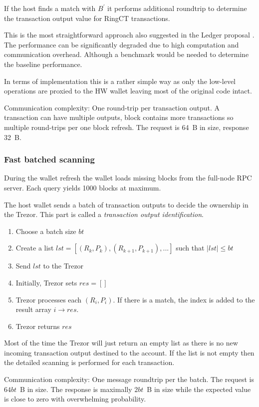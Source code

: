 \documentclass[]{article}
\begin{document}
If the host finds a match with $B^\prime$ it performs additional roundtrip to determine the transaction output value for RingCT transactions.

This is the most straightforward approach also suggested in the Ledger proposal \cite{ledger_doc}. The performance can be significantly degraded due to high computation and communication overhead. Although a benchmark would be needed to determine the baseline performance.

In terms of implementation this is a rather simple way as only the low-level operations are proxied to the HW wallet leaving most of the original code intact.

Communication complexity: One round-trip per transaction output. A transaction can have multiple outputs, block contains more transactions so multiple round-trips per one block refresh. The request is 64~B in size, response 32~B.

\subsubsection{Fast batched scanning}
During the wallet refresh the wallet loads missing blocks from the full-node RPC server. Each query yields 1000 blocks at maximum. 

The host wallet sends a batch of transaction outputs to decide the ownership in the Trezor. This part is called a \emph{transaction output identification}.

\begin{enumerate}
	\item Choose a batch size $bt$
	\item Create a list $lst = [(R_k, P_k), (R_{k+1}, P_{k+1}), ...]$ such that $|lst| \leq bt$
	\item Send $lst$ to the Trezor
	\item Initially, Trezor sets $res = []$
	\item Trezor processes each $(R_i, P_i)$. If there is a match, the index is added to the result array $i \rightarrow res$.
	\item Trezor returns $res$ 
\end{enumerate}
Most of the time the Trezor will just return an empty list as there is no new incoming transaction output destined to the account. If the list is not empty then the detailed scanning is performed for each transaction. 

Communication complexity: One message roundtrip per the batch. The request is $64bt$~B in size. The response is maximally $2bt$~B in size while the expected value is close to zero with overwhelming probability. 
\end{document}
